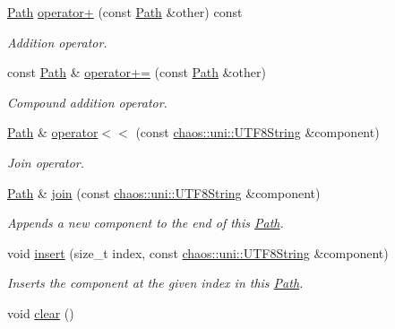 \begin{DoxyCompactItemize}
\hyperlink{classchaos_1_1io_1_1sys_1_1_path}{Path} \hyperlink{classchaos_1_1io_1_1sys_1_1_path_a5e769fd87717e15f0580e9aacbc0a418}{operator+} (const \hyperlink{classchaos_1_1io_1_1sys_1_1_path}{Path} \&other) const 
\begin{DoxyCompactList}\small\item\em Addition operator. \end{DoxyCompactList}\item 
const \hyperlink{classchaos_1_1io_1_1sys_1_1_path}{Path} \& \hyperlink{classchaos_1_1io_1_1sys_1_1_path_a92a616d9f16047d8933020bab54ed494}{operator+=} (const \hyperlink{classchaos_1_1io_1_1sys_1_1_path}{Path} \&other)
\begin{DoxyCompactList}\small\item\em Compound addition operator. \end{DoxyCompactList}\item 
\hyperlink{classchaos_1_1io_1_1sys_1_1_path}{Path} \& \hyperlink{classchaos_1_1io_1_1sys_1_1_path_a9b3f24e1f3bcb8e989c4b21d70d0a052}{operator$<$$<$} (const \hyperlink{classchaos_1_1uni_1_1_u_t_f8_string}{chaos\-::uni\-::\-U\-T\-F8\-String} \&component)
\begin{DoxyCompactList}\small\item\em Join operator. \end{DoxyCompactList}\item 
\hyperlink{classchaos_1_1io_1_1sys_1_1_path}{Path} \& \hyperlink{classchaos_1_1io_1_1sys_1_1_path_a8fcd75bd349c4c6d1286f6549e34de8c}{join} (const \hyperlink{classchaos_1_1uni_1_1_u_t_f8_string}{chaos\-::uni\-::\-U\-T\-F8\-String} \&component)
\begin{DoxyCompactList}\small\item\em Appends a new component to the end of this \hyperlink{classchaos_1_1io_1_1sys_1_1_path}{Path}. \end{DoxyCompactList}\item 
void \hyperlink{classchaos_1_1io_1_1sys_1_1_path_a7dc2fc570f8475ba5147bffb01de7025}{insert} (size\-\_\-t index, const \hyperlink{classchaos_1_1uni_1_1_u_t_f8_string}{chaos\-::uni\-::\-U\-T\-F8\-String} \&component)
\begin{DoxyCompactList}\small\item\em Inserts the component at the given index in this \hyperlink{classchaos_1_1io_1_1sys_1_1_path}{Path}. \end{DoxyCompactList}\item 
void \hyperlink{classchaos_1_1io_1_1sys_1_1_path_a7c4cd7e5d8e21a8c522f8a87f1e90f4c}{clear} ()

\end{DoxyCompactItemize}
